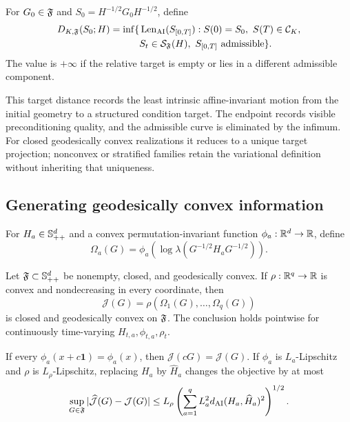 \begin{definition}
\label{def:restricted-complexity}
For \(G_0\in\mathfrak F\) and \(S_0=H^{-1/2}G_0H^{-1/2}\), define
\[
\begin{aligned}
  D_{K,\mathfrak F}(S_0;H)
  =
  \inf\{&\operatorname{Len}_{\mathrm{AI}}(S_{[0,T]}):
  S(0)=S_0,\ S(T)\in\mathcal C_K,\\
  &S_t\in\mathcal S_\mathfrak F(H),
  \ S_{[0,T]}\text{ admissible}\}.
\end{aligned}
\]
The value is \(+\infty\) if the relative target is empty or lies in a
different admissible component.
\end{definition}

This target distance records the least intrinsic affine-invariant motion from the initial geometry to a structured condition target.  The endpoint records visible
preconditioning quality, and the admissible curve is eliminated by the
infimum.  For closed geodesically convex realizations it reduces to a unique
target projection; nonconvex or stratified families retain the variational
definition without inheriting that uniqueness.

\subsection{Generating geodesically convex information}

For \(H_a\in\mathbb S_{++}^d\) and a convex permutation-invariant function
\(\phi_a:\mathbb R^d\to\mathbb R\), define
\[
  \Omega_a(G)
  =
  \phi_a\!\left(
  \log\lambda(G^{-1/2}H_aG^{-1/2})
  \right).
\]

\begin{theorem}
\label{thm:structured-log-spectral-mother}
Let \(\mathfrak F\subset\mathbb S_{++}^d\) be nonempty, closed, and geodesically convex.  If
\(\rho:\mathbb R^q\to\mathbb R\) is convex and nondecreasing in every coordinate, then
\[
  \mathcal J(G)
  =
  \rho(\Omega_1(G),\ldots,\Omega_q(G))
\]
is closed and geodesically convex on \(\mathfrak F\).  The conclusion holds pointwise
for continuously time-varying \(H_{t,a},\phi_{t,a},\rho_t\).

If every \(\phi_a(x+c\mathbf1)=\phi_a(x)\), then \(\mathcal J(cG)=\mathcal
J(G)\).  If \(\phi_a\) is \(L_a\)-Lipschitz and \(\rho\) is
\(L_\rho\)-Lipschitz, replacing \(H_a\) by \(\widehat H_a\) changes the
objective by at most
\[
  \sup_{G\in\mathfrak F}
  |\widehat{\mathcal J}(G)-\mathcal J(G)|
  \le
  L_\rho
  \left(\sum_{a=1}^qL_a^2
  d_{\mathrm{AI}}(H_a,\widehat H_a)^2\right)^{1/2}.
\]
\end{theorem}

